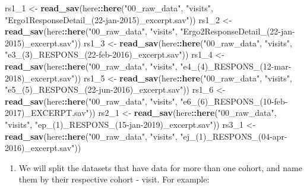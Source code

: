\documentclass[]{book}
\newenvironment{Shaded}{\begin{snugshade}}{\end{snugshade}}
\newcommand{\DecValTok}[1]{\textcolor[rgb]{0.00,0.00,0.81}{#1}}
\newcommand{\KeywordTok}[1]{\textcolor[rgb]{0.13,0.29,0.53}{\textbf{#1}}}
\newcommand{\NormalTok}[1]{#1}
\newcommand{\OperatorTok}[1]{\textcolor[rgb]{0.81,0.36,0.00}{\textbf{#1}}}
\newcommand{\StringTok}[1]{\textcolor[rgb]{0.31,0.60,0.02}{#1}}
\providecommand{\tightlist}{%
  \setlength{\itemsep}{0pt}\setlength{\parskip}{0pt}}
\begin{document}
\begin{Shaded}
\begin{Highlighting}[]
\NormalTok{rs1_}\DecValTok{1}\NormalTok{ <-}\StringTok{ }\KeywordTok{read_sav}\NormalTok{(here}\OperatorTok{::}\KeywordTok{here}\NormalTok{(}\StringTok{"00_raw_data"}\NormalTok{, }\StringTok{"visits"}\NormalTok{, }\StringTok{"Ergo1ResponseDetail_(22-jan-2015)_excerpt.sav"}\NormalTok{))}
\NormalTok{rs1_}\DecValTok{2}\NormalTok{ <-}\StringTok{ }\KeywordTok{read_sav}\NormalTok{(here}\OperatorTok{::}\KeywordTok{here}\NormalTok{(}\StringTok{"00_raw_data"}\NormalTok{, }\StringTok{"visits"}\NormalTok{, }\StringTok{"Ergo2ResponseDetail_(22-jan-2015)_excerpt.sav"}\NormalTok{))}
\NormalTok{rs1_}\DecValTok{3}\NormalTok{ <-}\StringTok{ }\KeywordTok{read_sav}\NormalTok{(here}\OperatorTok{::}\KeywordTok{here}\NormalTok{(}\StringTok{"00_raw_data"}\NormalTok{, }\StringTok{"visits"}\NormalTok{, }\StringTok{"e3_(3)_RESPONS_(22-feb-2016)_excerpt.sav"}\NormalTok{))}
\NormalTok{rs1_}\DecValTok{4}\NormalTok{ <-}\StringTok{ }\KeywordTok{read_sav}\NormalTok{(here}\OperatorTok{::}\KeywordTok{here}\NormalTok{(}\StringTok{"00_raw_data"}\NormalTok{, }\StringTok{"visits"}\NormalTok{, }\StringTok{"e4_(4)_RESPONS_(12-mar-2018)_excerpt.sav"}\NormalTok{))}
\NormalTok{rs1_}\DecValTok{5}\NormalTok{ <-}\StringTok{ }\KeywordTok{read_sav}\NormalTok{(here}\OperatorTok{::}\KeywordTok{here}\NormalTok{(}\StringTok{"00_raw_data"}\NormalTok{, }\StringTok{"visits"}\NormalTok{, }\StringTok{"e5_(5)_RESPONS_(22-jun-2016)_excerpt.sav"}\NormalTok{))}
\NormalTok{rs1_}\DecValTok{6}\NormalTok{ <-}\StringTok{ }\KeywordTok{read_sav}\NormalTok{(here}\OperatorTok{::}\KeywordTok{here}\NormalTok{(}\StringTok{"00_raw_data"}\NormalTok{, }\StringTok{"visits"}\NormalTok{, }\StringTok{"e6_(6)_RESPONS_(10-feb-2017)_EXCERPT.sav"}\NormalTok{))}
\NormalTok{rs2_}\DecValTok{1}\NormalTok{ <-}\StringTok{ }\KeywordTok{read_sav}\NormalTok{(here}\OperatorTok{::}\KeywordTok{here}\NormalTok{(}\StringTok{"00_raw_data"}\NormalTok{, }\StringTok{"visits"}\NormalTok{, }\StringTok{"ep_(1)_RESPONS_(15-jan-2019)_excerpt.sav"}\NormalTok{))}
\NormalTok{rs3_}\DecValTok{1}\NormalTok{ <-}\StringTok{ }\KeywordTok{read_sav}\NormalTok{(here}\OperatorTok{::}\KeywordTok{here}\NormalTok{(}\StringTok{"00_raw_data"}\NormalTok{, }\StringTok{"visits"}\NormalTok{, }\StringTok{"ej_(1)_RESPONS_(04-apr-2016)_excerpt.sav"}\NormalTok{))}
\end{Highlighting}
\end{Shaded}

\begin{enumerate}
\def\labelenumi{\arabic{enumi}.}
\setcounter{enumi}{1}
\tightlist
\item
  We will split the datasets that have data for more than one cohort, and name them by their respective cohort - visit. For example:
\end{enumerate}
\end{document}
